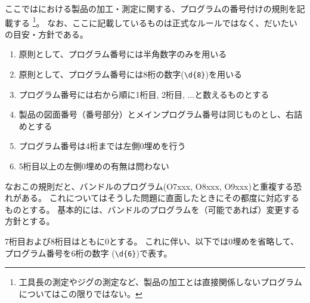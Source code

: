 

ここでは\DMname における製品の加工・測定に関する、プログラムの番号付けの規則を記載する
\footnote{工具長の測定やジグの測定など、製品の加工とは直接関係しないプログラムについてはこの限りではない。}。
なお、ここに記載しているものは正式なルールではなく、だいたいの目安・方針である。
\begin{enumerate}[label=\Roman*., ref=\Roman*)]
\item 原則として、プログラム番号には半角数字のみを用いる
\item 原則として、プログラム番号には8桁の数字(\verb|\d{8}|)を用いる
\item プログラム番号には右から順に1桁目, 2桁目, ...と数えるものとする
\item 製品の図面番号（番号部分）とメインプログラム番号は同じものとし、右詰めとする
\item プログラム番号は4桁までは左側0埋めを行う
\item 5桁目以上の左側0埋めの有無は問わない
\end{enumerate}
なおこの規則だと、バンドルのプログラム(O7xxx, O8xxx, O9xxx)と重複する恐れがある。
これについてはそうした問題に直面したときにその都度に対応するものとする。
基本的には、バンドルのプログラムを（可能であれば）変更する方針とする。



7桁目および8桁目はともに0とする。
これに伴い、以下では0埋めを省略して、プログラム番号を6桁の数字 (\verb|\d{6}|)で表す。



